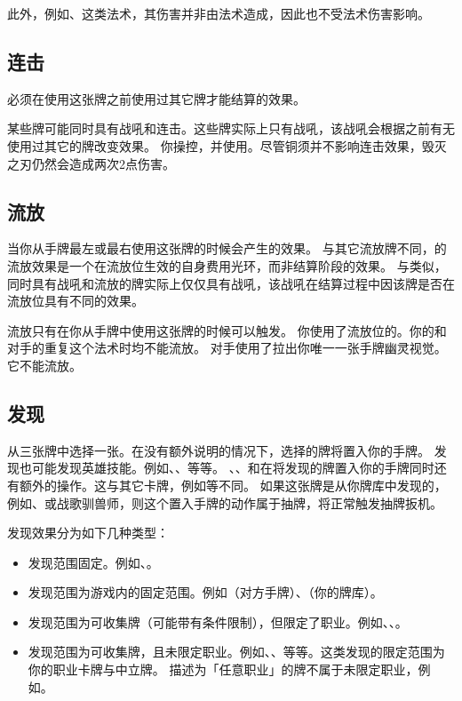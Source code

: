 此外，例如、这类法术，其伤害并非由法术造成，因此也不受法术伤害影响。

\subsection{连击}
\label{combo}

必须在使用这张牌之前使用过其它牌才能结算的效果。

某些牌可能同时具有战吼和连击。这些牌实际上只有战吼，该战吼会根据之前有无使用过其它的牌改变效果。
\example 你操控，并使用。尽管铜须并不影响连击效果，毁灭之刃仍然会造成两次2点伤害。

\subsection{流放}
\label{outcast}

当你从手牌最左或最右使用这张牌的时候会产生的效果。
\notice 与其它流放牌不同，的流放效果是一个在流放位生效的自身费用光环，而非结算阶段的效果。
\notice 与类似，同时具有战吼和流放的牌实际上仅仅具有战吼，该战吼在结算过程中因该牌是否在流放位具有不同的效果。

流放只有在你从手牌中使用这张牌的时候可以触发。
\example 你使用了流放位的。你的和对手的重复这个法术时均不能流放。
\example 对手使用了拉出你唯一一张手牌幽灵视觉。它不能流放。

\subsection{发现}
\label{discover}

从三张牌中选择一张。在没有额外说明的情况下，选择的牌将置入你的手牌。
\notice 发现也可能发现英雄技能。例如、、等等。
\exception {}、、和在将发现的牌置入你的手牌同时还有额外的操作。这与其它卡牌，例如等不同。
\notice 如果这张牌是从你牌库中发现的，例如、或战歌驯兽师，则这个置入手牌的动作属于抽牌，将正常触发抽牌扳机。

发现效果分为如下几种类型：
\begin{itemize}
    \item 发现范围固定。例如、。
    \item 发现范围为游戏内的固定范围。例如（对方手牌）、（你的牌库）。
    \item 发现范围为可收集牌（可能带有条件限制），但限定了职业。例如、、。
    \item 发现范围为可收集牌，且未限定职业。例如、、等等。这类发现的限定范围为你的职业卡牌与中立牌。
        \notice 描述为「任意职业」的牌不属于未限定职业，例如。
\end{itemize}

